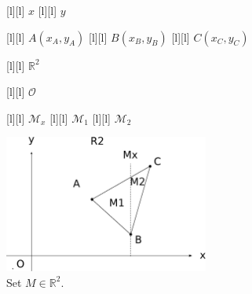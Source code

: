 \begin{figure}[ht]
	\centering
	\footnotesize

	[l] {$x$}
	[l] {$y$}

	[l] {$A(x_A,y_A)$}
	[l] {$B(x_B,y_B)$}
	[l] {$C(x_C,y_C)$}

	[l] {$\mathbb{R}^2$}

	[l] {$\mathcal{O}$}

	[l] {$\mathcal{M}_x$}
	[l] {$\mathcal{M}_1$}
	[l] {$\mathcal{M}_2$}

	\includegraphics[width=0.6\textwidth]{setAinR2_Ax.eps}
	\caption{Set $M \in \mathbb{R}^2$.}
	\label{\LABEL}
\end{figure}
